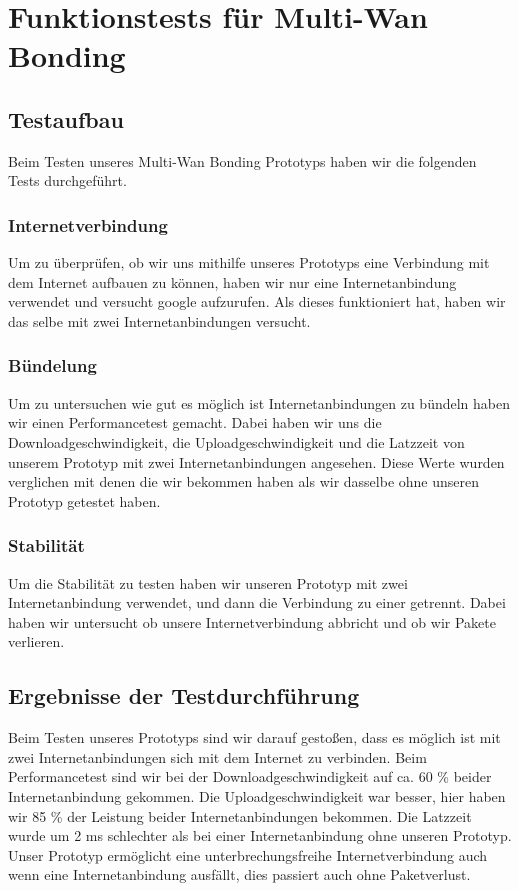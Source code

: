 \chapter{Funktionstests für Multi-Wan Bonding}
\label{cha:Funktionstests für Multi-Wan Bonding}

\section{Testaufbau}
Beim Testen unseres Multi-Wan Bonding Prototyps haben wir die folgenden Tests durchgeführt. 

\subsection{Internetverbindung}
Um zu überprüfen, ob wir uns mithilfe unseres Prototyps eine Verbindung mit dem Internet aufbauen zu können, haben wir nur eine Internetanbindung verwendet und versucht google aufzurufen. Als dieses funktioniert hat, haben wir das selbe mit zwei Internetanbindungen versucht.

\subsection{Bündelung}
Um zu untersuchen wie gut es möglich ist Internetanbindungen zu bündeln haben wir einen Performancetest gemacht. Dabei haben wir uns die Downloadgeschwindigkeit, die Uploadgeschwindigkeit und die Latzzeit von unserem Prototyp mit zwei Internetanbindungen angesehen. Diese Werte wurden verglichen mit denen die wir bekommen haben als wir dasselbe ohne unseren Prototyp getestet haben. 

\subsection{Stabilität}
Um die Stabilität zu testen haben wir unseren Prototyp mit zwei Internetanbindung verwendet, und dann die Verbindung zu einer getrennt. Dabei haben wir untersucht ob unsere Internetverbindung abbricht und ob wir Pakete verlieren. 

\section{Ergebnisse der Testdurchführung}
Beim Testen unseres Prototyps sind wir darauf gestoßen, dass es möglich ist mit zwei Internetanbindungen sich mit dem Internet zu verbinden. Beim Performancetest sind wir bei der Downloadgeschwindigkeit auf ca. 60 \% beider Internetanbindung gekommen. Die Uploadgeschwindigkeit war besser, hier haben wir 85 \% der Leistung beider Internetanbindungen bekommen. Die Latzzeit wurde um 2 ms schlechter als bei einer Internetanbindung ohne unseren Prototyp. Unser Prototyp ermöglicht eine unterbrechungsfreihe Internetverbindung auch wenn eine Internetanbindung ausfällt, dies passiert auch ohne Paketverlust.